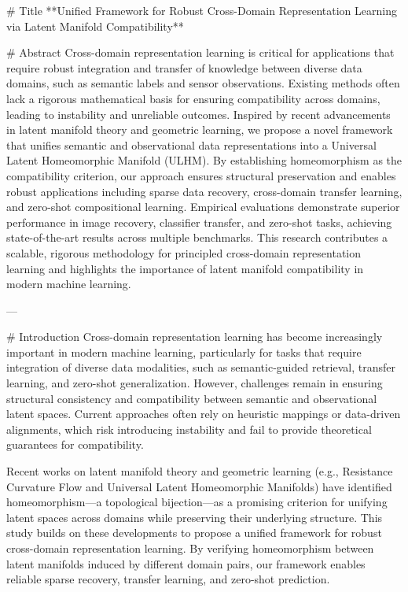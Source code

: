 # Title  
**Unified Framework for Robust Cross-Domain Representation Learning via Latent Manifold Compatibility**

# Abstract  
Cross-domain representation learning is critical for applications that require robust integration and transfer of knowledge between diverse data domains, such as semantic labels and sensor observations. Existing methods often lack a rigorous mathematical basis for ensuring compatibility across domains, leading to instability and unreliable outcomes. Inspired by recent advancements in latent manifold theory and geometric learning, we propose a novel framework that unifies semantic and observational data representations into a Universal Latent Homeomorphic Manifold (ULHM). By establishing homeomorphism as the compatibility criterion, our approach ensures structural preservation and enables robust applications including sparse data recovery, cross-domain transfer learning, and zero-shot compositional learning. Empirical evaluations demonstrate superior performance in image recovery, classifier transfer, and zero-shot tasks, achieving state-of-the-art results across multiple benchmarks. This research contributes a scalable, rigorous methodology for principled cross-domain representation learning and highlights the importance of latent manifold compatibility in modern machine learning.

---

# Introduction  
Cross-domain representation learning has become increasingly important in modern machine learning, particularly for tasks that require integration of diverse data modalities, such as semantic-guided retrieval, transfer learning, and zero-shot generalization. However, challenges remain in ensuring structural consistency and compatibility between semantic and observational latent spaces. Current approaches often rely on heuristic mappings or data-driven alignments, which risk introducing instability and fail to provide theoretical guarantees for compatibility.

Recent works on latent manifold theory and geometric learning (e.g., Resistance Curvature Flow and Universal Latent Homeomorphic Manifolds) have identified homeomorphism—a topological bijection—as a promising criterion for unifying latent spaces across domains while preserving their underlying structure. This study builds on these developments to propose a unified framework for robust cross-domain representation learning. By verifying homeomorphism between latent manifolds induced by different domain pairs, our framework enables reliable sparse recovery, transfer learning, and zero-shot prediction.

